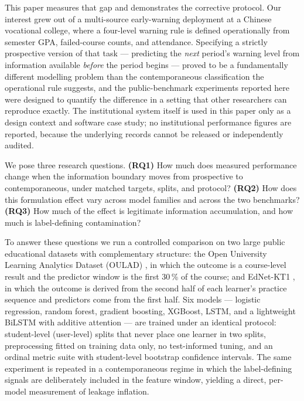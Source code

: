 \documentclass[sn-mathphys,Numbered]{sn-jnl}
\begin{document}
This paper measures that gap and demonstrates the corrective protocol. Our interest grew out of a multi-source early-warning deployment at a Chinese vocational college, where a four-level warning rule is defined operationally from semester GPA, failed-course counts, and attendance. Specifying a strictly prospective version of that task --- predicting the \emph{next} period's warning level from information available \emph{before} the period begins --- proved to be a fundamentally different modelling problem than the contemporaneous classification the operational rule suggests, and the public-benchmark experiments reported here were designed to quantify the difference in a setting that other researchers can reproduce exactly. The institutional system itself is used in this paper only as a design context and software case study; no institutional performance figures are reported, because the underlying records cannot be released or independently audited.

We pose three research questions.
\textbf{(RQ1)} How much does measured performance change when the information boundary moves from prospective to contemporaneous, under matched targets, splits, and protocol?
\textbf{(RQ2)} How does this formulation effect vary across model families and across the two benchmarks?
\textbf{(RQ3)} How much of the effect is legitimate information accumulation, and how much is label-defining contamination?

To answer these questions we run a controlled comparison on two large public educational datasets with complementary structure: the Open University Learning Analytics Dataset (OULAD) \cite{Kuzilek2017}, in which the outcome is a course-level result and the predictor window is the first 30\,\% of the course; and EdNet-KT1 \cite{Choi2020}, in which the outcome is derived from the second half of each learner's practice sequence and predictors come from the first half. Six models --- logistic regression, random forest, gradient boosting, XGBoost, LSTM, and a lightweight BiLSTM with additive attention --- are trained under an identical protocol: student-level (user-level) splits that never place one learner in two splits, preprocessing fitted on training data only, no test-informed tuning, and an ordinal metric suite with student-level bootstrap confidence intervals. The same experiment is repeated in a contemporaneous regime in which the label-defining signals are deliberately included in the feature window, yielding a direct, per-model measurement of leakage inflation.
\end{document}
